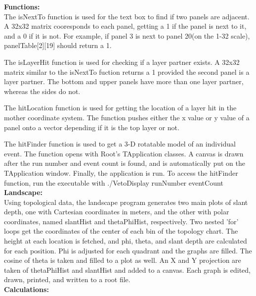 \documentclass[a4paper,12pt]{article}
\begin{document}
\textbf{Functions:} \\
	The isNextTo function is used for the text box to find if two panels are adjacent. A 32x32 matrix cooresponds to each panel, getting a 1 if the panel is next to it, and a 0 if it is not. For example, if panel 3 is next to panel 20(on the 1-32 scale), panelTable[2][19] should return a 1. 

The isLayerHit function is used for checking if a layer partner exists. A 32x32 matrix similar to the isNextTo fuction returns a 1 provided the second panel is a layer partner. The bottom and upper panels have more than one layer partner, whereas the sides do not.

The hitLocation function is used for getting the location of a layer hit in the mother coordinate system. The function pushes either the x value or y value of a panel onto a vector depending if it is the top layer or not.

The hitFinder function is used to get a 3-D rotatable model of an individual event. The function opens with Root's TApplication classes. A canvas is drawn after the run number and event count is found, and is automatically put on the TApplication window. Finally, the application is run. To access the hitFinder function, run the executable with ./VetoDisplay runNumber eventCount \\

\textbf{Landscape:} \\
Using topological data, the landscape program generates two main plots of slant depth, one with Cartesian coordinates in meters, and the other with polar coordinates, named slantHist and thetaPhiHist, respectively. Two nested 'for' loops get the coordinates of the center of each bin of the topology chart. The height at each location is fetched, and phi, theta, and slant depth are calculated for each position.
Phi is adjusted for each quadrant and the graphs are filled. The cosine of theta is taken and filled to a plot as well. An X and Y projection are taken of thetaPhiHist and slantHist and added to a canvas. Each graph is edited, drawn, printed, and written to a root file. \\
\textbf{Calculations:} \\

\begin{figure}[H]
%
\end{figure}
\end{document}
